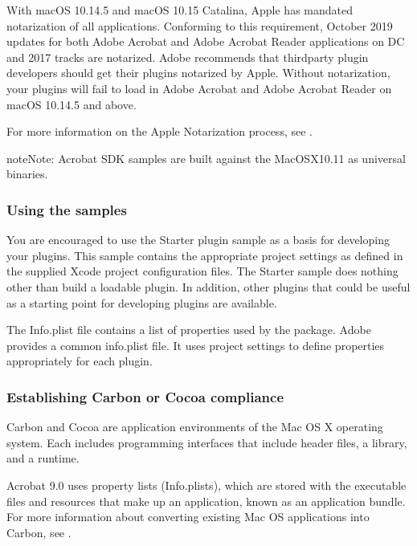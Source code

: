 \documentclass[letterpaper,12pt,english,openany,oneside]{sphinxmanual}
\begin{document}
With macOS 10.14.5 and macOS 10.15 Catalina, Apple has mandated notarization of all applications. Conforming to this requirement, October 2019 updates for both Adobe Acrobat and Adobe Acrobat Reader applications on DC and 2017 tracks are notarized. Adobe recommends that third\sphinxhyphen{}party plug\sphinxhyphen{}in developers should get their plug\sphinxhyphen{}ins notarized by Apple. Without notarization, your plug\sphinxhyphen{}ins will fail to load in Adobe Acrobat and Adobe Acrobat Reader on macOS 10.14.5 and above.

For more information on the Apple Notarization process, see .

\begin{sphinxadmonition}{note}{Note:}
Acrobat SDK samples are built against the MacOSX10.11 as universal binaries.
\end{sphinxadmonition}


\subsubsection{Using the samples}
\label{\detokenize{Plugins_CreatingSimplePlug:using-the-samples}}
You are encouraged to use the Starter plugin sample as a basis for developing your plugins. This sample contains the appropriate project settings as defined in the supplied Xcode project configuration files. The Starter sample does nothing other than build a loadable plugin. In addition, other plugins that could be useful as a starting point for developing plugins are available.

The Info.plist file contains a list of properties used by the package. Adobe provides a common info.plist file. It uses project settings to define properties appropriately for each plugin.


\subsubsection{Establishing Carbon or Cocoa compliance}
\label{\detokenize{Plugins_CreatingSimplePlug:establishing-carbon-or-cocoa-compliance}}
Carbon and Cocoa are application environments of the Mac OS X operating system. Each includes programming interfaces that include header files, a library, and a runtime.

Acrobat 9.0 uses property lists (Info.plists), which are stored with the executable files and resources that make up an application, known as an application bundle. For more information about converting existing Mac OS applications into Carbon, see .
\end{document}
